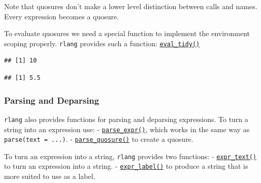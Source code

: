 \documentclass[]{book}
\newenvironment{Shaded}{\begin{snugshade}}{\end{snugshade}}
\newcommand{\DecValTok}[1]{\textcolor[rgb]{0.00,0.00,0.81}{#1}}
\newcommand{\KeywordTok}[1]{\textcolor[rgb]{0.13,0.29,0.53}{\textbf{#1}}}
\newcommand{\NormalTok}[1]{#1}
\newcommand{\OperatorTok}[1]{\textcolor[rgb]{0.81,0.36,0.00}{\textbf{#1}}}
\newcommand{\StringTok}[1]{\textcolor[rgb]{0.31,0.60,0.02}{#1}}
\begin{document}
Note that quosures don't make a lower level distinction between calls and names. Every
expression becomes a quosure.

To evaluate quosures we need a special function to implement the environment scoping
properly. \texttt{rlang} provides such a function:
\href{rlang.tidyverse.org/reference/eval_tidy.html}{\texttt{eval\_tidy()}}

\begin{Shaded}
\end{Shaded}

\begin{verbatim}
## [1] 10
\end{verbatim}

\begin{Shaded}
\end{Shaded}

\begin{verbatim}
## [1] 5.5
\end{verbatim}

\hypertarget{parsing-and-deparsing-1}{%
\subsubsection{Parsing and Deparsing}\label{parsing-and-deparsing-1}}

\texttt{rlang} also provides functions for parsing and deparsing expressions. To turn a string
into an expression use:
- \href{http://rlang.tidyverse.org/reference/parse_expr.html}{\texttt{parse\_expr()}}, which works in
the same way as \texttt{parse(text\ =\ ...)}.
- \href{http://rlang.tidyverse.org/reference/parse_expr.html}{\texttt{parse\_quosure()}} to create a
quosure.

To turn an expression into a string, \texttt{rlang} provides two functions:
- \href{http://rlang.tidyverse.org/reference/expr_label.html}{\texttt{expr\_text()}} to turn an
expression into a string.
- \href{http://rlang.tidyverse.org/reference/expr_label.html}{\texttt{expr\_label()}} to produce a
string that is more suited to use as a label.
\end{document}
